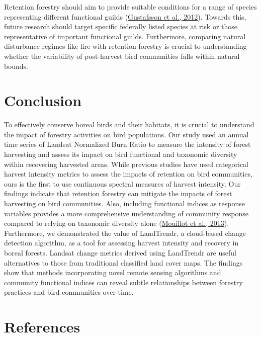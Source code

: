 \documentclass[
  12pt,
]{article}
\begin{document}
Retention forestry should aim to provide suitable conditions for a range of species representing different functional guilds (\protect\hyperlink{ref-gustafssonRetentionForestryMaintain2012}{Gustafsson et al., 2012}). Towards this, future research should target specific federally listed species at risk or those representative of important functional guilds. Furthermore, comparing natural disturbance regimes like fire with retention forestry is crucial to understanding whether the variability of post-harvest bird communities falls within natural bounds.

\hypertarget{conclusion}{%
\section{Conclusion}\label{conclusion}}

To effectively conserve boreal birds and their habitats, it is crucial to understand the impact of forestry activities on bird populations. Our study used an annual time series of Landsat Normalized Burn Ratio to measure the intensity of forest harvesting and assess its impact on bird functional and taxonomic diversity within recovering harvested areas. While previous studies have used categorical harvest intensity metrics to assess the impacts of retention on bird communities, ours is the first to use continuous spectral measures of harvest intensity. Our findings indicate that retention forestry can mitigate the impacts of forest harvesting on bird communities. Also, including functional indices as response variables provides a more comprehensive understanding of community response compared to relying on taxonomic diversity alone (\protect\hyperlink{ref-mouillot2013functional}{Mouillot et al., 2013}). Furthermore, we demonstrated the value of LandTrendr, a cloud-based change detection algorithm, as a tool for assessing harvest intensity and recovery in boreal forests. Landsat change metrics derived using LandTrendr are useful alternatives to those from traditional classified land cover maps. The findings show that methods incorporating novel remote sensing algorithms and community functional indices can reveal subtle relationships between forestry practices and bird communities over time.

\pagebreak

\hypertarget{references}{%
\section*{References}\label{references}}
\end{document}

